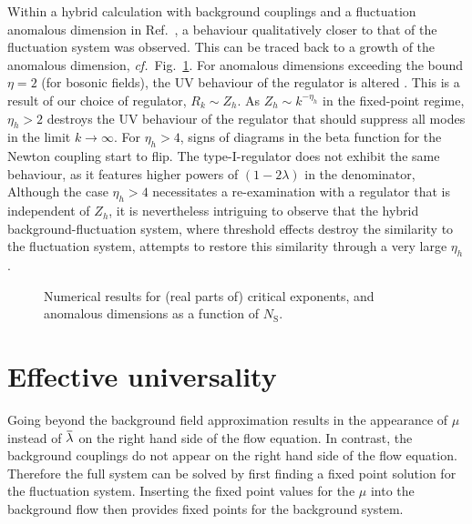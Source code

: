 \documentclass[11pt]{book}
\newcommand{\overbar}[1]{\mkern 1.5mu\overline{\mkern-1.5mu#1\mkern-1.5mu}\mkern 1.5mu}
\newcommand\NS{ N_{\scriptscriptstyle{\mathrm{S}}} }
\newcommand\cf{\textit{cf.}\ }
\numberwithin{equation}{chapter}
\begin{document}
Within a hybrid calculation with background couplings and a fluctuation anomalous dimension in
Ref.~\cite{Dona:2013qba},
a behaviour qualitatively closer to that of the fluctuation system was observed.
This can be traced back to a growth of the anomalous dimension, \cf Fig.~\ref{fig:critexpandeta}.
For anomalous dimensions exceeding the bound $\eta=2$ (for bosonic fields),
the UV behaviour of the regulator is altered \cite{Meibohm:2015twa}.
This is a result of our choice of regulator, $R_k \sim Z_h$.
As $Z_h \sim k^{-\eta_h}$ in the fixed-point regime,
$\eta_h>2$ destroys the UV behaviour of the regulator
that should suppress all modes in the limit $k \rightarrow \infty$.
For $\eta_h>4$, signs of diagrams in the beta function for the Newton coupling start to flip.
The type-I-regulator does not exhibit the same behaviour,
as it features higher powers of $(1-2\lambda)$ in the denominator,
Although the case $\eta_h>4$ necessitates a re-examination with a regulator that is independent of $Z_h$,
it is nevertheless intriguing to observe that the hybrid background-fluctuation system,
where threshold effects  destroy the similarity to the fluctuation system,
attempts to restore this similarity through a very large $\eta_h$.

\begin{figure}[t]
  \begin{center}
    
  \end{center}
  \caption{
    Numerical results for (real parts of) critical exponents,
    and anomalous dimensions as a function of $\NS$.
  }
  \label{fig:critexpandeta}
\end{figure}


\section{Effective universality}

Going beyond the background field approximation results in the appearance of $\mu$ instead
of $\overbar{\lambda}$ on the right hand side of the flow equation.
In contrast, the background couplings do not appear on the right hand side of the flow equation.
Therefore the full system can be solved by first finding a fixed point solution for the fluctuation system.
Inserting the fixed point values for the $\mu$ into the background flow then provides
fixed points for the background system.
\end{document}
